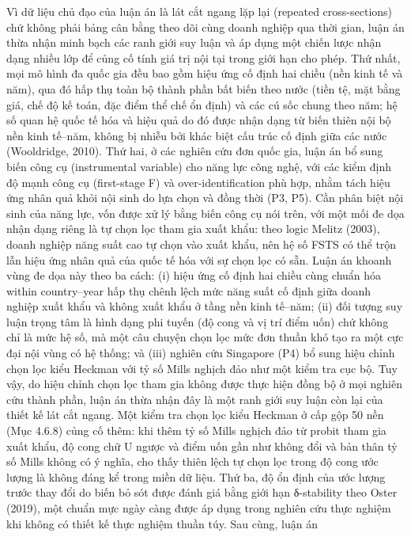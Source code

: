 \documentclass[
  a4paper,
  13pt]{extreport}
\begin{document}
Vì dữ liệu chủ đạo của luận án là lát cắt ngang lặp lại (repeated
cross-sections) chứ không phải bảng cân bằng theo dõi cùng doanh nghiệp
qua thời gian, luận án thừa nhận minh bạch các ranh giới suy luận và áp
dụng một chiến lược nhận dạng nhiều lớp để củng cố tính giá trị nội tại
trong giới hạn cho phép. Thứ nhất, mọi mô hình đa quốc gia đều bao gồm
hiệu ứng cố định hai chiều (nền kinh tế và năm), qua đó hấp thụ toàn bộ
thành phần bất biến theo nước (tiền tệ, mặt bằng giá, chế độ kế toán,
đặc điểm thể chế ổn định) và các cú sốc chung theo năm; hệ số quan hệ
quốc tế hóa và hiệu quả do đó được nhận dạng từ biến thiên nội bộ nền
kinh tế--năm, không bị nhiễu bởi khác biệt cấu trúc cố định giữa các
nước (Wooldridge, 2010). Thứ hai, ở các nghiên cứu đơn quốc gia, luận án
bổ sung biến công cụ (instrumental variable) cho năng lực công nghệ, với
các kiểm định độ mạnh công cụ (first-stage F) và over-identification phù
hợp, nhằm tách hiệu ứng nhân quả khỏi nội sinh do lựa chọn và đồng thời
(P3, P5). Cần phân biệt nội sinh của năng lực, vốn được xử lý bằng biến
công cụ nói trên, với một mối đe dọa nhận dạng riêng là tự chọn lọc tham
gia xuất khẩu: theo logic Melitz (2003), doanh nghiệp năng suất cao tự
chọn vào xuất khẩu, nên hệ số FSTS có thể trộn lẫn hiệu ứng nhân quả của
quốc tế hóa với sự chọn lọc có sẵn. Luận án khoanh vùng đe dọa này theo
ba cách: (i) hiệu ứng cố định hai chiều cùng chuẩn hóa within
country--year hấp thụ chênh lệch mức năng suất cố định giữa doanh nghiệp
xuất khẩu và không xuất khẩu ở tầng nền kinh tế--năm; (ii) đối tượng suy
luận trọng tâm là hình dạng phi tuyến (độ cong và vị trí điểm uốn) chứ
không chỉ là mức hệ số, mà một câu chuyện chọn lọc mức đơn thuần khó tạo
ra một cực đại nội vùng có hệ thống; và (iii) nghiên cứu Singapore (P4)
bổ sung hiệu chỉnh chọn lọc kiểu Heckman với tỷ số Mills nghịch đảo như
một kiểm tra cục bộ. Tuy vậy, do hiệu chỉnh chọn lọc tham gia không được
thực hiện đồng bộ ở mọi nghiên cứu thành phần, luận án thừa nhận đây là
một ranh giới suy luận còn lại của thiết kế lát cắt ngang. Một kiểm tra
chọn lọc kiểu Heckman ở cấp gộp 50 nền (Mục 4.6.8) củng cố thêm: khi
thêm tỷ số Mills nghịch đảo từ probit tham gia xuất khẩu, độ cong chữ U
ngược và điểm uốn gần như không đổi và bản thân tỷ số Mills không có ý
nghĩa, cho thấy thiên lệch tự chọn lọc trong độ cong ước lượng là không
đáng kể trong miền dữ liệu. Thứ ba, độ ổn định của ước lượng trước thay
đổi do biến bỏ sót được đánh giá bằng giới hạn δ-stability theo Oster
(2019), một chuẩn mực ngày càng được áp dụng trong nghiên cứu thực
nghiệm khi không có thiết kế thực nghiệm thuần túy. Sau cùng, luận án
\end{document}
